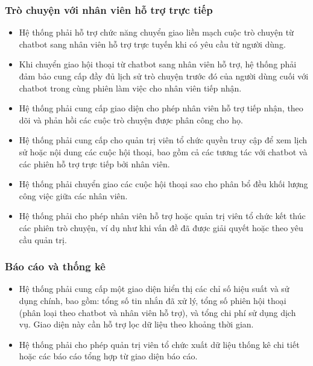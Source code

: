 \subsubsection{Trò chuyện với nhân viên hỗ trợ trực tiếp}
\begin{itemize}
    \item Hệ thống phải hỗ trợ chức năng chuyển giao liền mạch cuộc trò chuyện từ chatbot sang nhân viên hỗ trợ trực tuyến khi có yêu cầu từ người dùng.
    \item Khi chuyển giao hội thoại từ chatbot sang nhân viên hỗ trợ, hệ thống phải đảm bảo cung cấp đầy đủ lịch sử trò chuyện trước đó của người dùng cuối với chatbot trong cùng phiên làm việc cho nhân viên tiếp nhận.
    \item Hệ thống phải cung cấp giao diện cho phép nhân viên hỗ trợ tiếp nhận, theo dõi và phản hồi các cuộc trò chuyện được phân công cho họ.
    \item Hệ thống phải cung cấp cho quản trị viên tổ chức quyền truy cập để xem lịch sử hoặc nội dung các cuộc hội thoại, bao gồm cả các tương tác với chatbot và các phiên hỗ trợ trực tiếp bởi nhân viên.
    \item Hệ thống phải chuyển giao các cuộc hội thoại sao cho phân bổ đều khối lượng công việc giữa các nhân viên.
    \item Hệ thống phải cho phép nhân viên hỗ trợ hoặc quản trị viên tổ chức kết thúc các phiên trò chuyện, ví dụ như khi vấn đề đã được giải quyết hoặc theo yêu cầu quản trị.
\end{itemize}

\subsubsection{Báo cáo và thống kê}
\begin{itemize}
    \item Hệ thống phải cung cấp một giao diện hiển thị các chỉ số hiệu suất và sử dụng chính, bao gồm: tổng số tin nhắn đã xử lý, tổng số phiên hội thoại (phân loại theo chatbot và nhân viên hỗ trợ), và tổng chi phí sử dụng dịch vụ. Giao diện này cần hỗ trợ lọc dữ liệu theo khoảng thời gian.
    \item Hệ thống phải cho phép quản trị viên tổ chức xuất dữ liệu thống kê chi tiết hoặc các báo cáo tổng hợp từ giao diện báo cáo.
\end{itemize}

